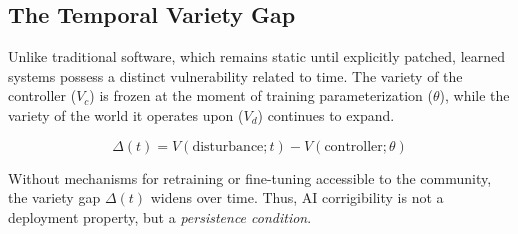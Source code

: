 \documentclass{article}
\begin{document}
\subsection{The Temporal Variety Gap}

Unlike traditional software, which remains static until explicitly patched, learned systems possess a distinct vulnerability related to time. The variety of the controller ($V_c$) is frozen at the moment of training parameterization ($\theta$), while the variety of the world it operates upon ($V_d$) continues to expand.

\begin{equation}
\Delta(t) = V(\text{disturbance}; t) - V(\text{controller}; \theta)
\end{equation}

Without mechanisms for retraining or fine-tuning accessible to the community, the variety gap $\Delta(t)$ widens over time. Thus, AI corrigibility is not a deployment property, but a \textit{persistence condition}.
\end{document}
